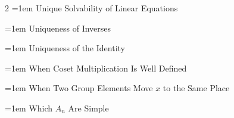 \documentclass[11pt]{report}
\begin{document}
\begin{multicols}{2}
\noindent\hangindent=1em Unique Solvability of Linear Equations\dotfill \pageref{prop:unique-solvability-linear-equations}\par
\noindent\hangindent=1em Uniqueness of Inverses\dotfill \pageref{prop:uniqueness-inverses}\par
\noindent\hangindent=1em Uniqueness of the Identity\dotfill \pageref{prop:uniqueness-identity}\par
\noindent\hangindent=1em When Coset Multiplication Is Well Defined\dotfill \pageref{prop:when-coset-multiplication-well-defined}\par
\noindent\hangindent=1em When Two Group Elements Move $x$ to the Same Place\dotfill \pageref{prop:when-two-group-elements-move-x-same-place}\par
\noindent\hangindent=1em Which $A_n$ Are Simple\dotfill \pageref{cor:which-an-simple}\par
\end{multicols}
\end{document}
